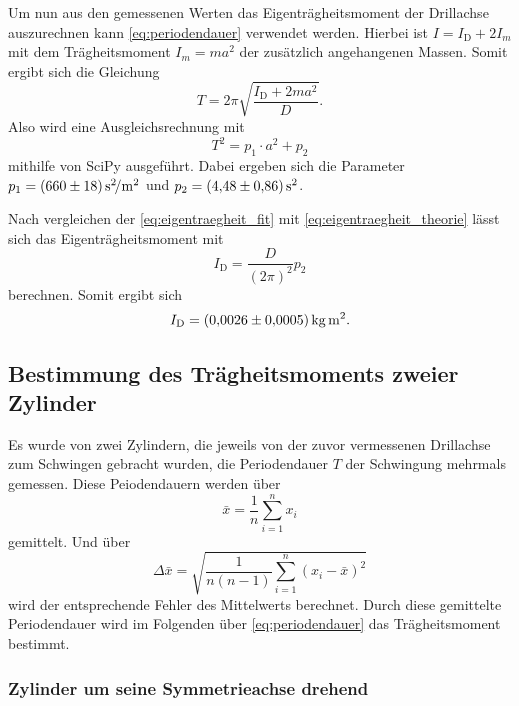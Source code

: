 Um nun aus den gemessenen Werten das Eigenträgheitsmoment der Drillachse auszurechnen kann \autoref{eq:periodendauer} verwendet werden. Hierbei ist $I=I_\text{D}+2I_m$ mit dem Trägheitsmoment $I_m=ma^2$ der zusätzlich angehangenen Massen. Somit ergibt sich die Gleichung
\begin{equation}
    T=2\pi \sqrt{\frac{I_\text{D}+2ma^2}{D}}.
    \label{eq:eigentraegheit_theorie}
\end{equation}
Also wird eine Ausgleichsrechnung mit
\begin{equation}
    T^2 = p_1 \cdot a^2 + p_2
    \label{eq:eigentraegheit_fit}
\end{equation}
mithilfe von SciPy ausgeführt.\cite{scipy} Dabei ergeben sich die Parameter $p_1=\SI{660+-18}{\second\squared\per\meter\squared}$ und $p_2=\SI{4.48+-0.86}{\second\squared}$. 

Nach vergleichen der \autoref{eq:eigentraegheit_fit} mit \autoref{eq:eigentraegheit_theorie} lässt sich das Eigenträgheitsmoment mit
\begin{equation}
    I_\text{D} = \frac{D}{(2\pi)^2}p_2
\end{equation}
berechnen. Somit ergibt sich
\begin{equation}
    I_\text{D} = \SI{0.0026+-0.0005}{\kilo\gram\meter\squared}.
\end{equation}

\subsection{Bestimmung des Trägheitsmoments zweier Zylinder}
\label{sec:zylinder}

Es wurde von zwei Zylindern, die jeweils von der zuvor vermessenen Drillachse zum Schwingen gebracht wurden, die Periodendauer $T$ der Schwingung mehrmals gemessen. Diese Peiodendauern werden über
\begin{equation}
    \bar{x} = \frac{1}{n} \sum_{i=1}^n x_i
\end{equation}
gemittelt.
Und über 
\begin{equation}
    \Delta\bar{x} = \sqrt{\frac{1}{n(n-1)}\sum_{i=1}^n (x_i - \bar{x})^2}
\end{equation}
wird der entsprechende Fehler des Mittelwerts berechnet.
Durch diese gemittelte Periodendauer wird im Folgenden über \autoref{eq:periodendauer} das Trägheitsmoment bestimmt.

\subsubsection{Zylinder um seine Symmetrieachse drehend}
\label{sec:brauner_zylinder}

